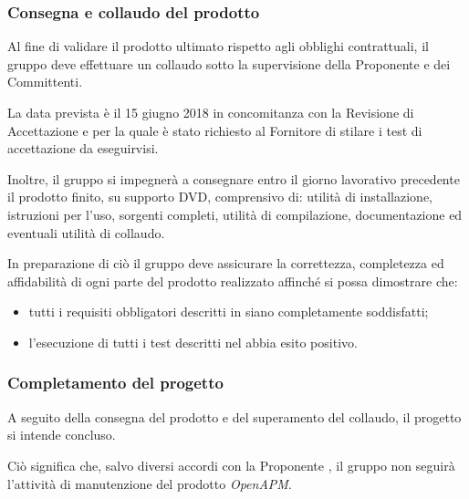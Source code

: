 		\subsubsection{Consegna e collaudo del prodotto}

			Al fine di validare il prodotto ultimato rispetto agli obblighi contrattuali, il gruppo deve effettuare un
			collaudo sotto la supervisione della Proponente e dei Committenti.

			La data prevista è il 15 giugno 2018 in concomitanza con la Revisione di Accettazione e per la quale è stato richiesto al Fornitore
			di stilare i test di accettazione da eseguirvisi.

			Inoltre, il gruppo si impegnerà a consegnare entro il giorno lavorativo precedente il prodotto finito, su supporto DVD,
			comprensivo di: utilità di installazione, istruzioni per l'uso, sorgenti completi, utilità di compilazione, documentazione
			ed eventuali utilità di collaudo.
			
			In preparazione di ciò il gruppo deve assicurare la correttezza, 	completezza ed affidabilità di ogni parte del
			prodotto realizzato affinché si possa dimostrare che:

			\begin{itemize}
				\item tutti i requisiti obbligatori descritti in \vAnalisiDeiRequisiti{} siano completamente soddisfatti;
				\item l'esecuzione di tutti i test descritti nel \vPianoDiQualifica{} abbia esito positivo.
			\end{itemize}
			
		\subsubsection{Completamento del progetto}
		
			A seguito della consegna del prodotto e del superamento del collaudo, il progetto si intende concluso.

			Ciò significa che, salvo diversi accordi con la Proponente \Proponente{}, il gruppo \GroupName{} non seguirà l'attività
			di manutenzione del prodotto \textit{OpenAPM}.
